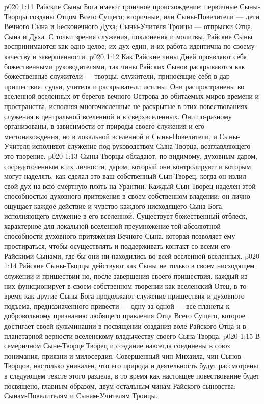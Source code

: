 \vs p020 1:11 \pc Райские Сыны Бога имеют троичное происхождение: первичные Сыны\hyp{}Творцы созданы Отцом Всего Сущего; вторичные, или Сыны\hyp{}Повелители --- дети Вечного Сына и Бесконечного Духа; Сыны\hyp{}Учителя Троицы --- отпрыски Отца, Сына и Духа. С точки зрения служения, поклонения и молитвы, Райские Сыны воспринимаются как одно целое; их дух един, и их работа идентична по своему качеству и завершенности.
\vs p020 1:12 Как Райские чины Дней проявляют себя божественными руководителями, так чины Райских Сынов раскрываются как божественные служители --- творцы, служители, приносящие себя в дар пришествия, судьи, учителя и раскрыватели истины. Они распространены во вселенной вселенных от берегов вечного Острова до обитаемых миров времени и пространства, исполняя многочисленные не раскрытые в этих повествованиях служения в центральной вселенной и в сверхвселенных. Они по\hyp{}разному организованы, в зависимости от природы своего служения и его местонахождения, но в локальной вселенной и Сыны\hyp{}Повелители, и Сыны\hyp{}Учителя исполняют служение под руководством Сына\hyp{}Творца, возглавляющего это творение.
\vs p020 1:13 Сыны\hyp{}Творцы обладают, по\hyp{}видимому, духовным даром, сосредоточенным в их личности, даром, который они контролируют и которым могут наделять, как сделал это ваш собственный Сын\hyp{}Творец, когда он излил свой дух на всю смертную плоть на Урантии. Каждый Сын\hyp{}Творец наделен этой способностью духовного притяжения в своем собственном владении; он лично ощущает каждое действие и чувство каждого нисходящего Сына Бога, исполняющего служение в его вселенной. Существует божественный отблеск, характерное для локальной вселенной преумножение той абсолютной способности духовного притяжения Вечного Сына, которая позволяет ему простираться, чтобы осуществлять и поддерживать контакт со всеми его Райскими Сынами, где бы они ни находились во всей вселенной вселенных.
\vs p020 1:14 Райские Сыны\hyp{}Творцы действуют как Сыны не только в своем нисходящем служении и пришествии но, после завершения своего пришествия, каждый из них функционирует в своем собственном творении как вселенский Отец, в то время как другие Сыны Бога продолжают служение пришествия и духовного подъема, предназначенного привести --- одну за одной --- все планеты к добровольному признанию любящего правления Отца Всего Сущего, которое достигает своей кульминации в посвящении создания воле Райского Отца и в планетарной верности вселенскому владычеству своего Сына\hyp{}Творца.
\vs p020 1:15 В семеричном Сыне\hyp{}Творце Творец и создание навсегда соединены в союз понимания, приязни и милосердия. Совершенный чин Михаила, чин Сынов\hyp{}Творцов, настолько уникален, что его природа и деятельность будут рассмотрены в следующем тексте этого раздела, в то время как настоящее повествование будет посвящено, главным образом, двум остальным чинам Райского сыновства: Сынам\hyp{}Повелителям и Сынам\hyp{}Учителям Троицы.
